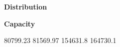 \documentclass[grey,handout]{beamer}
\renewcommand{\frametitle}[1]{\begin{center}\textbf{#1}\end{center}}
\begin{document}
\begin{frame}
  \frametitle{Distribution}
  
\end{frame}


\begin{frame}
  \frametitle{Capacity}
  \begin{multicols}{2}
  80799.23 81569.97
  154631.8 164730.1
  
  \end{multicols}
  
  
  \end{frame}
\end{document}
